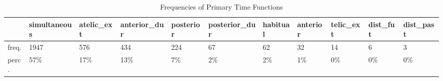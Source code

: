 \begin{table}[htbp!]
\centering
\caption{Frequencies of Primary Time Functions}
\label{table:funct_counts}
\begin{adjustbox}{width=1\textwidth}
\begin{tabular}{lllllllllll}
\toprule
{} & simultaneous & atelic\_ext & anterior\_dur & posterior & posterior\_dur & habitual & anterior & telic\_ext & dist\_fut & dist\_past \\
\midrule
freq. &         1947 &        576 &          434 &       224 &            67 &       62 &       32 &        14 &        6 &         3 \\
perc. &          57\% &        17\% &          13\% &        7\% &            2\% &       2\% &       1\% &        0\% &       0\% &        0\% \\
\bottomrule
\end{tabular}
\end{adjustbox}
\end{table}
